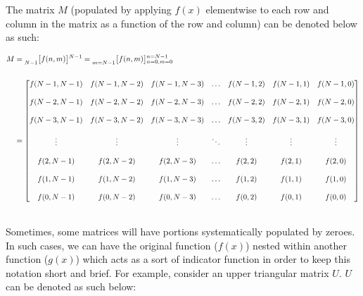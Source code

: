 \documentclass{article}
\begin{document}
The matrix $M$ (populated by applying $f(x)$ elementwise to each row and column in the matrix as a function of the row and column) can be denoted below as such:

\begin{align*}
    M&= \prescript{}{N - 1}{\begin{bmatrix} f(n, m) \end{bmatrix}}^{N - 1}
      = \prescript{}{m = N - 1}{\begin{bmatrix} f(n, m) \end{bmatrix}}^{n = N - 1}_{n = 0,m =0} \\ \\
     &= \begin{bmatrix}
            f(N - 1, N - 1) & f(N - 1, N - 2) & f(N - 1, N - 3) & \ldots & f(N - 1, 2) & f(N - 1, 1) & f(N - 1, 0) \\ \\
            f(N - 2, N - 1) & f(N - 2, N - 2) & f(N - 2, N - 3) & \ldots & f(N - 2, 2) & f(N - 2, 1) & f(N - 2, 0) \\ \\
            f(N - 3, N - 1) & f(N - 3, N - 2) & f(N - 3, N - 3) & \ldots & f(N - 3, 2) & f(N - 3, 1) & f(N - 3, 0) \\ \\
                     \vdots &          \vdots &          \vdots & \ddots &      \vdots &      \vdots &      \vdots \\ \\
            f(    2, N - 1) & f(    2, N - 2) & f(    2, N - 3) & \ldots & f(    2, 2) & f(    2, 1) & f(    2, 0) \\ \\
            f(    1, N - 1) & f(    1, N - 2) & f(    1, N - 3) & \ldots & f(    1, 2) & f(    1, 1) & f(    1, 0) \\ \\
            f(    0, N - 1) & f(    0, N - 2) & f(    0, N - 3) & \ldots & f(    0, 2) & f(    0, 1) & f(    0, 0)
          \end{bmatrix} \\ \\
  \end{align*} 

\newpage

Sometimes, some matrices will have portions systematically populated by zeroes. In such cases, we can have the original function ($f(x)$) nested within another function ($g(x)$) which acts as a sort of indicator function in order to keep this notation short and brief. For example, consider an upper triangular matrix $U$. $U$ can be denoted as such below:
\end{document}
